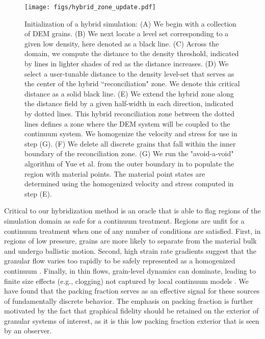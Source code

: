 \begin{figure}[htp] 
    \centering
    \texttt{[image: figs/hybrid\_zone\_update.pdf]}
    \caption{Initialization of a hybrid simulation: (A) We begin with a collection of DEM grains. (B) We next locate a level
    set corresponding to a given low density, here denoted as a black line. (C) Across the domain, we compute
    the distance to the density threshold, indicated by lines in lighter shades of red as the distance increases.
    (D) We select a user-tunable distance to the density level-set that serves as the center of the hybrid
    ``reconciliation" zone. We denote this critical distance as a solid black line. (E) We extend the hybrid zone
    along the distance field by a given half-width in each direction, indicated by dotted lines. This hybrid
    reconciliation zone between the dotted lines defines a zone where the DEM system will be coupled to the
    continuum system. We homogenize the velocity and stress for use in step (G). (F) We delete all discrete grains that fall within the inner boundary of the reconciliation zone.
    (G) We run the "avoid-a-void" algorithm of Yue et al. \cite{Yue:2015:Continuum} from the outer boundary in to populate the region with material points. The material point states are determined using the homogenized velocity and stress computed in step (E).}
    \label{hybrid_initialization}
\end{figure}
Critical to our hybridization method is an oracle that is able to flag regions of the simulation domain as safe for a
continuum treatment. Regions are unfit for a continuum treatment when one of any number of conditions are satisfied.
First, in regions of low pressure, grains are more likely to separate from the material bulk and undergo ballistic
motion. Second, high strain rate gradients suggest that the granular flow varies too rapidly to be safely represented as
a homogenized continuum \cite{Dijksman:2010:Granular,Kamrin:2010,Koval:2009:Annular}. Finally, in thin flows,
grain-level dynamics can dominate, leading to finite size effects (e.g., clogging) not captured by local continuum models
\cite{Beverloo:1961:Flow,Midi:2004:Dense,Pouliquen:1999:Scaling,Sheldon:2010:Granular}. We have found that the packing
fraction serves as an effective signal for these sources of fundamentally discrete behavior. The emphasis on packing fraction
is further motivated by the fact that graphical fidelity should be retained on the exterior of granular systems of interest, as it is this
low packing fraction exterior that is seen by an observer.

